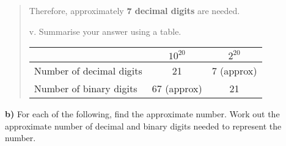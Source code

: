 \documentclass[12pt]{article}
\begin{document}
\begin{quote}
Therefore, approximately \textbf{7 decimal digits} are needed.

\vspace{0.5cm}

v. Summarise your answer using a table.

\vspace{0.3cm}

\begin{center}
\begin{tabular}{|l|c|c|}
\hline
 & $10^{20}$ & $2^{20}$ \\
\hline
Number of decimal digits & 21 & 7 (approx) \\
\hline
Number of binary digits & 67 (approx) & 21 \\
\hline
\end{tabular}
\end{center}

\end{quote}

\vspace{0.5cm}

\noindent\textbf{b)} For each of the following, find the approximate number. Work out the approximate number of decimal and binary digits needed to represent the number.

\vspace{0.3cm}
\end{document}
